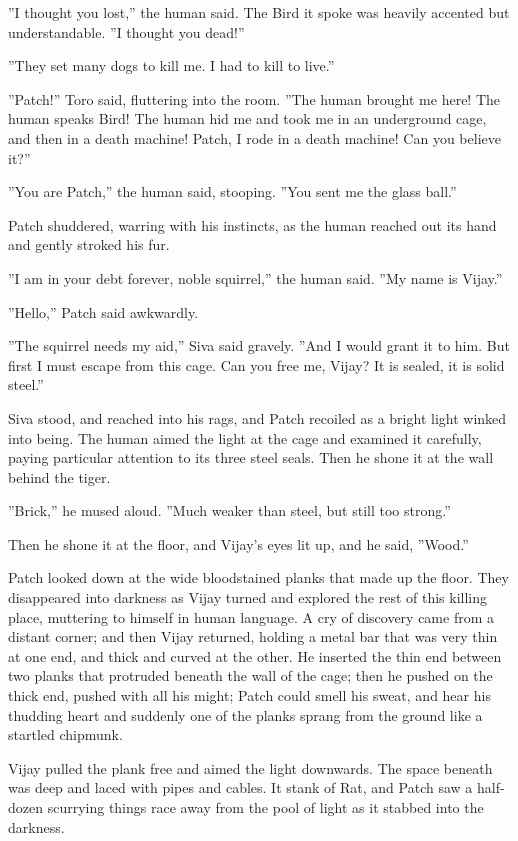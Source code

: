 \documentclass[11pt]{article}
\begin{document}
 ''I thought you lost,'' the human said. The Bird it spoke was heavily accented but understandable. ''I thought you dead!''\par
 ''They set many dogs to kill me. I had to kill to live.''\par
 ''Patch!'' Toro said, fluttering into the room. ''The human brought me here! The human speaks Bird! The human hid me and took me in an underground cage, and then in a death machine! Patch, I rode in a death machine! Can you believe it?''\par
 ''You are Patch,'' the human said, stooping. ''You sent me the glass ball.''\par
 Patch shuddered, warring with his instincts, as the human reached out its hand and gently stroked his fur.\par
 ''I am in your debt forever, noble squirrel,'' the human said. ''My name is Vijay.''\par
 ''Hello,'' Patch said awkwardly.\par
 ''The squirrel needs my aid,'' Siva said gravely. ''And I would grant it to him. But first I must escape from this cage. Can you free me, Vijay? It is sealed, it is solid steel.''\par
 Siva stood, and reached into his rags, and Patch recoiled as a bright light winked into being. The human aimed the light at the cage and examined it carefully, paying particular attention to its three steel seals. Then he shone it at the wall behind the tiger.\par
 ''Brick,'' he mused aloud. ''Much weaker than steel, but still too strong.''\par
 Then he shone it at the floor, and Vijay's eyes lit up, and he said, ''Wood.''\par
 Patch looked down at the wide bloodstained planks that made up the floor. They disappeared into darkness as Vijay turned and explored the rest of this killing place, muttering to himself in human language. A cry of discovery came from a distant corner; and then Vijay returned, holding a metal bar that was very thin at one end, and thick and curved at the other. He inserted the thin end between two planks that protruded beneath the wall of the cage; then he pushed on the thick end, pushed with all his might; Patch could smell his sweat, and hear his thudding heart %
 and suddenly one of the planks sprang from the ground like a startled chipmunk.\par
Vijay pulled the plank free and aimed the light downwards. The space beneath was deep and laced with pipes and cables. It stank of Rat, and Patch saw a half-dozen scurrying things race away from the pool of light as it stabbed into the darkness.\par
\end{document}
